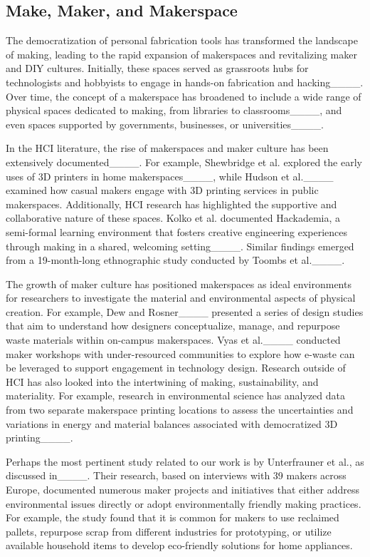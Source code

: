 \subsection{Make, Maker, and Makerspace}

The democratization of personal fabrication tools has transformed the landscape of making, leading to the rapid expansion of makerspaces and revitalizing maker and DIY cultures. 
Initially, these spaces served as grassroots hubs for technologists and hobbyists to engage in hands-on fabrication and hacking____.
Over time, the concept of a makerspace has broadened to include a wide range of physical spaces dedicated to making, from libraries to classrooms____, and even spaces supported by governments, businesses, or universities____.

In the HCI literature, the rise of makerspaces and maker culture has been extensively documented____. 
For example, Shewbridge et al. explored the early uses of 3D printers in home makerspaces____, while Hudson et al.____ examined how casual makers engage with 3D printing services in public makerspaces. 
Additionally, HCI research has highlighted the supportive and collaborative nature of these spaces. 
Kolko et al. documented Hackademia, a semi-formal learning environment that fosters creative engineering experiences through making in a shared, welcoming setting____. 
Similar findings emerged from a 19-month-long ethnographic study conducted by Toombs et al.____.

The growth of maker culture has positioned makerspaces as ideal environments for researchers to investigate the material and environmental aspects of physical creation. 
For example, Dew and Rosner____ presented a series of design studies that aim to understand how designers conceptualize, manage, and repurpose waste materials within on-campus makerspaces. 
Vyas et al.____ conducted maker workshops with under-resourced communities to explore how e-waste can be leveraged to support engagement in technology design. 
Research outside of HCI has also looked into the intertwining of making, sustainability, and materiality. 
For example, research in environmental science has analyzed data from two separate makerspace printing locations to assess the uncertainties and variations in energy and material balances associated with democratized 3D printing____.

Perhaps the most pertinent study related to our work is by Unterfrauner et al., as discussed in____. Their research, based on interviews with 39 makers across Europe, documented numerous maker projects and initiatives that either address environmental issues directly or adopt environmentally friendly making practices. 
For example, the study found that it is common for makers to use reclaimed pallets, repurpose scrap from different industries for prototyping, or utilize available household items to develop eco-friendly solutions for home appliances.

